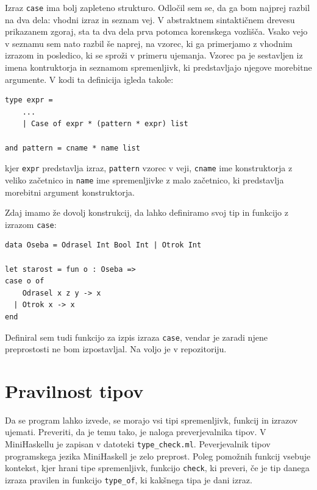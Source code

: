 \documentclass[a4paper,12pt,openright]{book}
\begin{document}
Izraz \lstinline{case} ima bolj zapleteno strukturo. Odločil sem se, da ga bom najprej razbil na dva dela: vhodni izraz in seznam vej. V abstraktnem sintaktičnem drevesu prikazanem zgoraj, 
sta ta dva dela prva potomca korenskega vozlišča. Vsako vejo v seznamu sem nato razbil še naprej, na vzorec, ki ga primerjamo z vhodnim izrazom in posledico, ki se sproži v primeru ujemanja. 
Vzorec pa je sestavljen iz imena kontruktorja in seznamom spremenljivk, ki predstavljajo njegove morebitne argumente. V kodi ta definicija igleda takole:
\begin{lstlisting}
type expr =
    ...
    | Case of expr * (pattern * expr) list

and pattern = cname * name list
\end{lstlisting}
kjer \lstinline{expr} predstavlja izraz, \lstinline{pattern} vzorec v veji, \lstinline{cname} ime konstruktorja z veliko začetnico in \lstinline{name} ime spremenljivke z malo začetnico, ki predstavlja morebitni 
argument konstruktorja. 

Zdaj imamo že dovolj konstrukcij, da lahko definiramo svoj tip in funkcijo z izrazom \lstinline{case}: 
\begin{lstlisting}
data Oseba = Odrasel Int Bool Int | Otrok Int

let starost = fun o : Oseba => 
case o of 
    Odrasel x z y -> x 
  | Otrok x -> x
end
\end{lstlisting}

Definiral sem tudi funkcijo za izpis izraza \lstinline{case}, vendar je zaradi njene preprostosti ne bom izpostavljal. Na voljo je v repozitoriju.

\section{Pravilnost tipov}
 Da se program lahko izvede, se morajo vsi tipi spremenljivk, funkcij in izrazov ujemati. Preveriti, da je temu tako, je naloga preverjevalnika tipov. V MiniHaskellu je zapisan v datoteki 
 \lstinline{type_check.ml}. Peverjevalnik tipov programskega jezika MiniHaskell je zelo preprost. Poleg pomožnih funkcij vsebuje kontekst, kjer hrani tipe spremenljivk, funkcijo \lstinline{check}, 
 ki preveri, če je tip danega izraza pravilen in funkcijo \lstinline{type_of}, ki kakšnega tipa je dani izraz.
 
\end{document}
